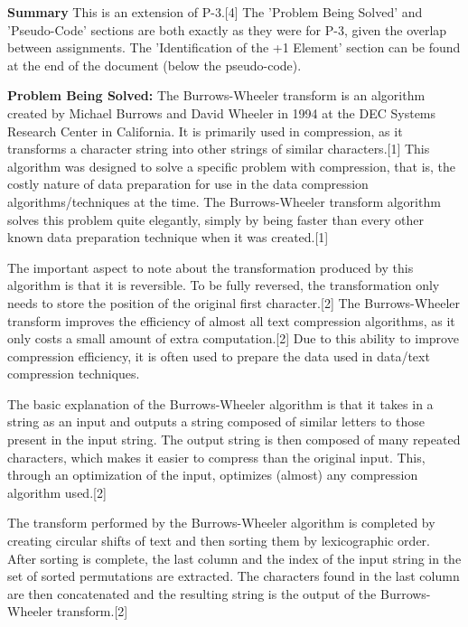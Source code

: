 \documentclass{article}
\begin{document}
\textbf{Summary}
\newline This is an extension of P-3.[4] The 'Problem Being Solved' and 'Pseudo-Code' sections are both exactly as they were for P-3, given the overlap between assignments. The 'Identification of the +1 Element' section can be found at the end of the document (below the pseudo-code).

\textbf{Problem Being Solved:}
   \newline The Burrows-Wheeler transform is an algorithm created by Michael Burrows and David Wheeler in 1994 at the DEC Systems Research Center in California. It is primarily used in compression, as it transforms a character string into other strings of similar characters.[1] This algorithm was designed to solve a specific problem with compression, that is, the costly nature of data preparation for use in the data compression algorithms/techniques at the time. The Burrows-Wheeler transform algorithm solves this problem quite elegantly, simply by being faster than every other known data preparation technique when it was created.[1]

   The important aspect to note about the transformation produced by this algorithm is that it is reversible. To be fully reversed, the transformation only needs to store the position of the original first character.[2] The Burrows-Wheeler transform improves the efficiency of almost all text compression algorithms, as it only costs a small amount of extra computation.[2] Due to this ability to improve compression efficiency, it is often used to prepare the data used in data/text compression techniques. 
   
   The basic explanation of the Burrows-Wheeler algorithm is that it takes in a string as an input and outputs a string composed of similar letters to those present in the input string. The output string is then composed of many repeated characters, which makes it easier to compress than the original input. This, through an optimization of the input, optimizes (almost) any compression algorithm used.[2]
   
   The transform performed by the Burrows-Wheeler algorithm is completed by creating circular shifts of text and then sorting them by lexicographic order. After sorting is complete, the last column and the index of the input string in the set of sorted permutations are extracted. The characters found in the last column are then concatenated and the resulting string is the output of the Burrows-Wheeler transform.[2]
   
\end{document}
